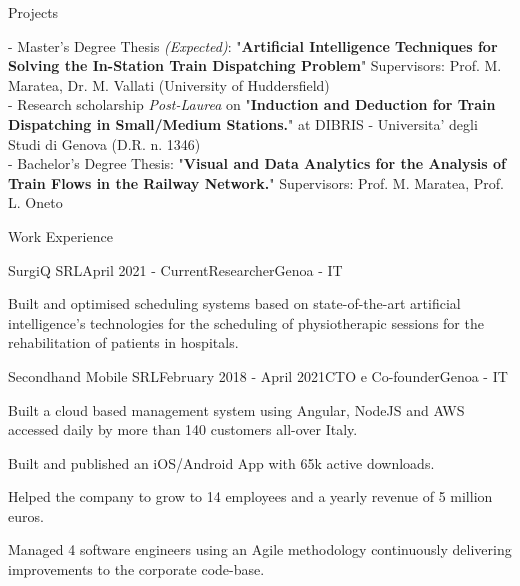 \documentclass{resume} %
\begin{document}
\begin{rSection}{Projects}

- Master's Degree Thesis \textit{(Expected)}: "\textbf{Artificial Intelligence Techniques for Solving the In-Station Train Dispatching Problem}" Supervisors: Prof. M. Maratea, Dr. M. Vallati (University of Huddersfield)\\
- Research scholarship \textit{Post-Laurea} on "\textbf{Induction and Deduction for Train Dispatching in Small/Medium Stations.}" at DIBRIS - Universita' degli Studi di Genova (D.R. n. 1346) \\
- Bachelor's Degree Thesis: "\textbf{Visual and Data Analytics for the Analysis of Train Flows in the Railway Network.}" Supervisors: Prof. M. Maratea, Prof. L. Oneto
	
\end{rSection}


\begin{rSection}{Work Experience}


\begin{rSubsection}{SurgiQ SRL}{April 2021 - Current}{Researcher}{Genoa - IT}
\item Built and optimised scheduling systems based on state-of-the-art artificial intelligence's technologies for the scheduling of physiotherapic sessions for the rehabilitation of patients in hospitals.
\end{rSubsection}

\begin{rSubsection}{Secondhand Mobile SRL}{February 2018 - April 2021}{CTO e Co-founder}{Genoa - IT}
\item Built a cloud based management system using Angular, NodeJS and AWS accessed daily by more than 140 customers all-over Italy.
\item Built and published an iOS/Android App with 65k active downloads.
\item Helped the company to grow to 14 employees and a yearly revenue of 5 million euros.
\item Managed 4 software engineers using an Agile methodology continuously delivering improvements to the corporate code-base.
\end{rSubsection}




\end{rSection}



\end{document}
